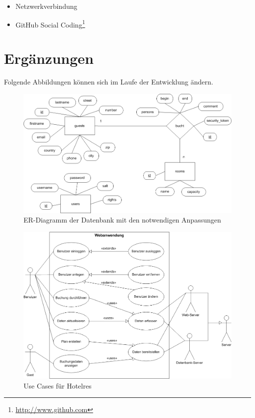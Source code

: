 \documentclass[a4paper,oneside,10pt]{scrreprt}
\begin{document}
\begin{itemize}
\item Netzwerkverbindung
\item GitHub Social Coding\footnote{\url{http://www.github.com}}
\end{itemize}


\chapter{Ergänzungen}

Folgende Abbildungen können sich im Laufe der Entwicklung ändern.

\hspace{2.5 cm} %

\begin{figure}[h]
\centering
\includegraphics[width=\textwidth]{er-chart.png}
\caption{ER-Diagramm der Datenbank mit den notwendigen Anpassungen}
\label{entity-relationship}
\end{figure}

\begin{figure}[h]
\centering
\includegraphics[width=\textwidth]{use-cases.png}
\caption{Use Cases für Hotelres}
\label{use-cases}
\end{figure}
\end{document}
